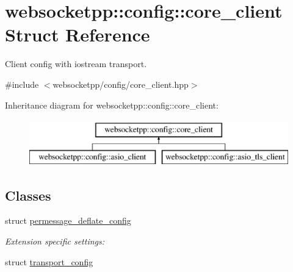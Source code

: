 \hypertarget{structwebsocketpp_1_1config_1_1core__client}{}\section{websocketpp\+:\+:config\+:\+:core\+\_\+client Struct Reference}
\label{structwebsocketpp_1_1config_1_1core__client}


Client config with iostream transport.  




{\ttfamily \#include $<$websocketpp/config/core\+\_\+client.\+hpp$>$}

Inheritance diagram for websocketpp\+:\+:config\+:\+:core\+\_\+client\+:\begin{figure}[H]
\begin{center}
\leavevmode
\includegraphics[height=2.000000cm]{structwebsocketpp_1_1config_1_1core__client}
\end{center}
\end{figure}
\subsection*{Classes}
\begin{DoxyCompactItemize}
\item 
struct \hyperlink{structwebsocketpp_1_1config_1_1core__client_1_1permessage__deflate__config}{permessage\+\_\+deflate\+\_\+config}
\begin{DoxyCompactList}\small\item\em Extension specific settings\+: \end{DoxyCompactList}\item 
struct \hyperlink{structwebsocketpp_1_1config_1_1core__client_1_1transport__config}{transport\+\_\+config}
\end{DoxyCompactItemize}
